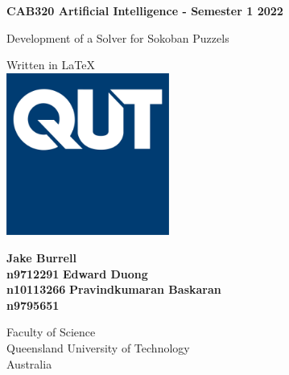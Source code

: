 \documentclass[a4paper,12pt]{article}
\begin{document}
\begin{titlepage}
   \begin{center}
       \vspace*{1cm}
 
       \textbf{CAB320 Artificial Intelligence - Semester 1 2022}
 
       \vspace{0.5cm}
        \LARGE{Development of a Solver for Sokoban Puzzels}
 
       \vspace{1.5cm}

       \vfill
       
       \vspace{0.8cm}
       \normalsize
 	   Written in \LaTeX \\
       \includegraphics[width=0.4\textwidth]{QUT.jpg}

       \large
       \textbf{Jake Burrell}\\
       \textbf{n9712291}
       \textbf{Edward Duong}\\
       \textbf{n10113266}
       \textbf{Pravindkumaran Baskaran}\\
       \textbf{n9795651}

       \vspace{1.5cm}
 
       \normalsize
       Faculty of Science \\
       Queensland University of Technology\\
       Australia\\ 
   \end{center}
\end{titlepage}

\end{document}

